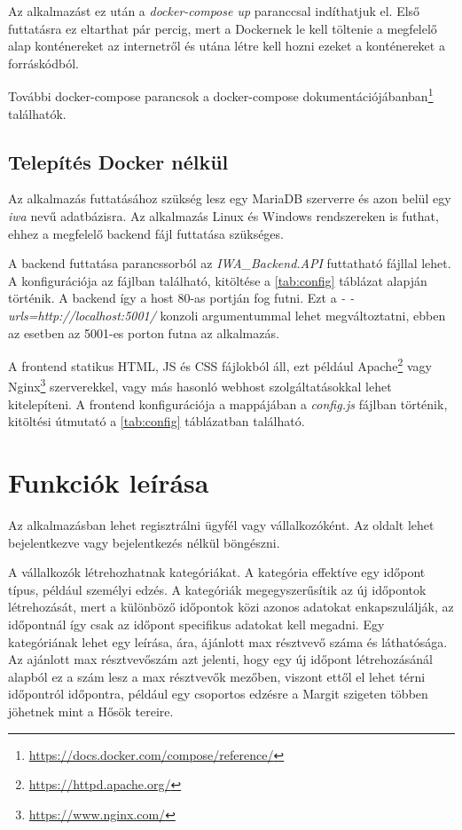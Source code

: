 Az alkalmazást ez után a \textit{docker-compose up} paranccsal indíthatjuk el. Első futtatásra ez eltarthat pár percig, mert a Dockernek le kell töltenie a megfelelő alap konténereket az internetről és utána létre kell hozni ezeket a konténereket a forráskódból.

További docker-compose parancsok a docker-compose dokumentációjábanban\footnote{\url{https://docs.docker.com/compose/reference/}} találhatók.

\subsection{Telepítés Docker nélkül}

Az alkalmazás futtatásához szükség lesz egy MariaDB szerverre és azon belül egy \textit{iwa} nevű adatbázisra. Az alkalmazás Linux és Windows rendszereken is futhat, ehhez a megfelelő backend fájl futtatása szükséges.

A backend futtatása parancssorból az \textit{IWA\_Backend.API} futtatható fájllal lehet. A konfigurációja az  fájlban található, kitöltése a \ref{tab:config} táblázat alapján történik. A backend így a host 80-as portján fog futni. Ezt a \textit{- -urls=http://localhost:5001/} konzoli argumentummal lehet megváltoztatni, ebben az esetben az 5001-es porton futna az alkalmazás.

A frontend statikus HTML, JS és CSS fájlokból áll, ezt például Apache\footnote{\url{https://httpd.apache.org/}} vagy Nginx\footnote{\url{https://www.nginx.com/}} szerverekkel, vagy más hasonló webhost szolgáltatásokkal lehet kitelepíteni. A frontend konfigurációja a mappájában a \textit{config.js} fájlban történik, kitöltési útmutató a \ref{tab:config} táblázatban található.

\section{Funkciók leírása}

Az alkalmazásban lehet regisztrálni ügyfél vagy vállalkozóként. Az oldalt lehet bejelentkezve vagy bejelentkezés nélkül böngészni.

A vállalkozók létrehozhatnak kategóriákat. A kategória effektíve egy időpont típus, például személyi edzés. A kategóriák megegyszerűsítik az új időpontok létrehozását, mert a különböző időpontok közi azonos adatokat enkapszulálják, az időpontnál így csak az időpont specifikus adatokat kell megadni. Egy kategóriának lehet egy leírása, ára, ájánlott max résztvevő száma és láthatósága. Az ajánlott max résztvevőszám azt jelenti, hogy egy új időpont létrehozásánál alapból ez a szám lesz a max résztvevők mezőben, viszont ettől el lehet térni időpontról időpontra, például egy csoportos edzésre a Margit szigeten többen jöhetnek mint a Hősök tereire.

